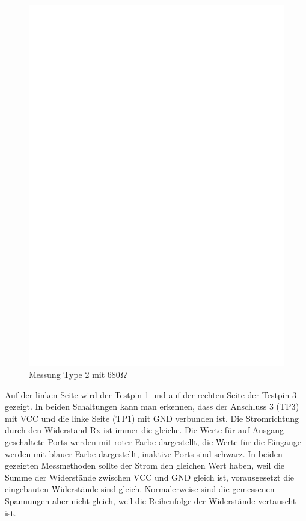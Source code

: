 \begin{figure}[H]
 \centering
 \includegraphics[]{../FIG/ResistormessL2.eps}
 \caption{Messung Type 2 mit \(680\Omega\) }
\label{fig:RL2mes}
\end{figure}

Auf der linken Seite wird der Testpin 1 und auf der rechten Seite der Testpin 3 gezeigt.
In beiden Schaltungen kann man erkennen, dass der Anschluss 3 (TP3) mit VCC und die linke Seite (TP1) mit
GND verbunden ist.
Die Stromrichtung durch den Widerstand Rx ist immer die gleiche.
Die Werte f\"ur auf Ausgang geschaltete Ports werden mit roter Farbe dargestellt, 
die Werte f\"ur die Eing\"ange werden mit blauer Farbe dargestellt, inaktive Ports sind schwarz.
In beiden gezeigten Messmethoden sollte der Strom den gleichen Wert haben, weil die Summe der Widerst\"ande zwischen
VCC und GND gleich ist, vorausgesetzt die eingebauten Widerst\"ande sind gleich.
Normalerweise sind die gemessenen Spannungen aber nicht gleich, weil die Reihenfolge
der Widerst\"ande vertauscht ist.


